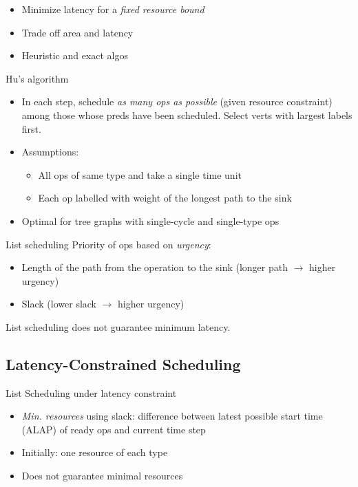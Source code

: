 \documentclass[a4paper]{article}
\begin{document}
\begin{itemize}
    \item Minimize latency for a \emph{fixed resource bound}
    \item Trade off area and latency
    \item Heuristic and exact algos
\end{itemize}

\begin{mainbox}{Hu's algorithm}
    \begin{itemize}
        \item In each step, schedule \emph{as many ops as possible} (given resource constraint) among those whose preds have been scheduled. Select verts with largest labels first.
        \item Assumptions:
        \begin{itemize}
            \item All ops of same type and take a single time unit
            \item Each op labelled with weight of the longest path to the sink
        \end{itemize}
        \item Optimal for tree graphs with single-cycle and single-type ops
    \end{itemize}
\end{mainbox}

\begin{mainbox}{List scheduling}
    Priority of ops based on \emph{urgency}:
    \begin{itemize}
        \item Length of the path from the operation to the sink (longer path $\rightarrow$ higher urgency)
        \item Slack (lower slack $\rightarrow$ higher urgency)
    \end{itemize}
    List scheduling does not guarantee minimum latency.
\end{mainbox}

\subsection{Latency-Constrained Scheduling}

\begin{mainbox}{List Scheduling under latency constraint}
    \begin{itemize}
        \item \emph{Min. resources} using slack: difference between latest possible start time (ALAP) of ready ops and current time step
        \item Initially: one resource of each type
        \item Does not guarantee minimal resources
    \end{itemize}
\end{mainbox}
\end{document}
